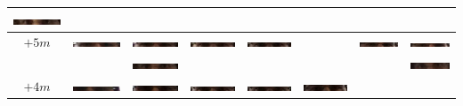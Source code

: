 \begin{tabular}{|c|c|c|c|c|c|c|c|}
\includegraphics[width=0.115\linewidth]{Auge1/A_Img6-2ThomasE.png} &
&
&
&
&
\\\hline 
$+5m$&
\includegraphics[width=0.115\linewidth]{Auge1/A_Img5-1FalkoE.png} &
\includegraphics[width=0.115\linewidth]{Auge1/A_Img5-2FalkoE.png} &
\includegraphics[width=0.115\linewidth]{Auge1/A_Img5-3FalkoE.png} &
\includegraphics[width=0.115\linewidth]{Auge1/A_Img5-4FalkoE.png} &
&
\includegraphics[width=0.115\linewidth]{Auge1/A_Img5-6FalkoE.png} &
\includegraphics[width=0.115\linewidth]{Auge1/A_Img5-7FalkoE.png} \\&
&
\includegraphics[width=0.115\linewidth]{Auge1/A_Img5-2ThomasE.png} &
&
&
&
&
\includegraphics[width=0.115\linewidth]{Auge1/A_Img5-7ThomasE.png} \\\hline 
$+4m$&
\includegraphics[width=0.115\linewidth]{Auge1/A_Img4-1FalkoE.png} &
\includegraphics[width=0.115\linewidth]{Auge1/A_Img4-2FalkoE.png} &
\includegraphics[width=0.115\linewidth]{Auge1/A_Img4-3FalkoE.png} &
\includegraphics[width=0.115\linewidth]{Auge1/A_Img4-4FalkoE.png} &
\includegraphics[width=0.115\linewidth]{Auge1/A_Img4-5FalkoE.png} &

\end{tabular}
